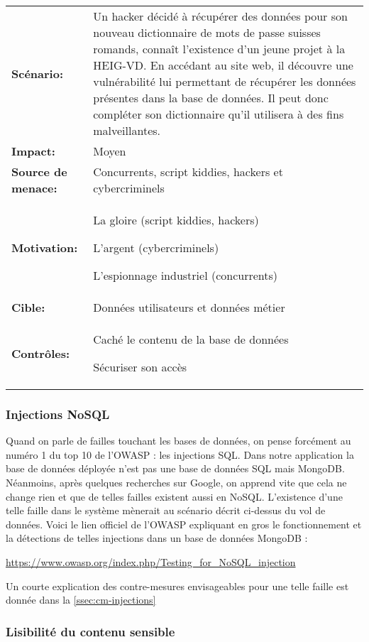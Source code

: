 \renewcommand{\arraystretch}{1.6}
\begin{tabular}{@{}p{4cm}p{12cm}}
\textbf{Scénario:} &  Un hacker décidé à récupérer des données pour son nouveau dictionnaire de mots de passe suisses romands, connaît l'existence d'un jeune projet à la HEIG-VD. En accédant au site web, il découvre une vulnérabilité lui permettant de récupérer les données présentes dans la base de données. Il peut donc compléter son dictionnaire qu'il utilisera à des fins malveillantes. \\
\textbf{Impact:} & Moyen \\
\textbf{Source de menace: } & Concurrents, script kiddies, hackers et cybercriminels \\
\textbf{Motivation:} & La gloire (script kiddies, hackers)

L'argent (cybercriminels)

L'espionnage industriel (concurrents) \\
\textbf{Cible:} & Données utilisateurs et données métier \\
\textbf{Contrôles:} & Caché le contenu de la base de données

Sécuriser son accès
\end{tabular}
\renewcommand{\arraystretch}{1}

\subsubsection{Injections NoSQL}

Quand on parle de failles touchant les bases de données, on pense forcément au numéro 1 du top 10 de l'OWASP : les injections SQL. Dans notre application la base de données déployée n'est pas une base de données SQL mais MongoDB. Néanmoins, après quelques recherches sur Google, on apprend vite que cela ne change rien et que de telles failles existent aussi en NoSQL. L'existence d'une telle faille dans le système mènerait au scénario décrit ci-dessus du vol de données. Voici le lien officiel de l'OWASP expliquant en gros le fonctionnement et la détections de telles injections dans un base de données MongoDB : 

\url{https://www.owasp.org/index.php/Testing_for_NoSQL_injection}

Un courte explication des contre-mesures envisageables pour une telle faille est donnée dans la \autoref{ssec:cm-injections}

\subsubsection{Lisibilité du contenu sensible}

